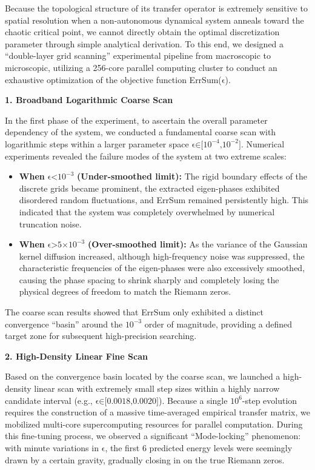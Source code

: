 Because the topological structure of its transfer operator is extremely
sensitive to spatial resolution when a non-autonomous dynamical system
anneals toward the chaotic critical point, we cannot directly obtain the
optimal discretization parameter through simple analytical derivation.
To this end, we designed a ``double-layer grid scanning'' experimental
pipeline from macroscopic to microscopic, utilizing a 256-core parallel
computing cluster to conduct an exhaustive optimization of the objective
function ErrSum(\(\text{ϵ}\)).

\textbf{1. Broadband Logarithmic Coarse Scan}

In the first phase of the experiment, to ascertain the overall parameter
dependency of the system, we conducted a fundamental coarse scan with
logarithmic steps within a larger parameter space
\(\text{ϵ∈[}\text{10}^{\text{−4}}\text{,}\text{10}^{\text{−2}}\text{]}\).
Numerical experiments revealed the failure modes of the system at two
extreme scales:

\begin{itemize}
\item
  \textbf{When} \(\text{ϵ<}\text{10}^{\text{−3}}\)
  \textbf{(Under-smoothed limit):} The rigid boundary effects of the
  discrete grids became prominent, the extracted eigen-phases exhibited
  disordered random fluctuations, and ErrSum remained persistently high.
  This indicated that the system was completely overwhelmed by numerical
  truncation noise.
\item
  \textbf{When} \(\text{ϵ>5×}\text{10}^{\text{−3}}\)
  \textbf{(Over-smoothed limit):} As the variance of the Gaussian kernel
  diffusion increased, although high-frequency noise was suppressed, the
  characteristic frequencies of the eigen-phases were also excessively
  smoothed, causing the phase spacing to shrink sharply and completely
  losing the physical degrees of freedom to match the Riemann zeros.
\end{itemize}

The coarse scan results showed that ErrSum only exhibited a distinct
convergence ``basin'' around the \(\text{10}^{\text{−3}}\) order of
magnitude, providing a defined target zone for subsequent high-precision
searching.

\textbf{2. High-Density Linear Fine Scan}

Based on the convergence basin located by the coarse scan, we launched a
high-density linear scan with extremely small step sizes within a highly
narrow candidate interval (e.g., \(\text{ϵ∈[0.0018,0.0020]}\)). Because
a single \(\text{10}^{\text{6}}\)-step evolution requires the
construction of a massive time-averaged empirical transfer matrix, we
mobilized multi-core supercomputing resources for parallel computation.
During this fine-tuning process, we observed a significant
``Mode-locking'' phenomenon: with minute variations in \(\text{ϵ}\), the
first 6 predicted energy levels were seemingly drawn by a certain
gravity, gradually closing in on the true Riemann zeros.

